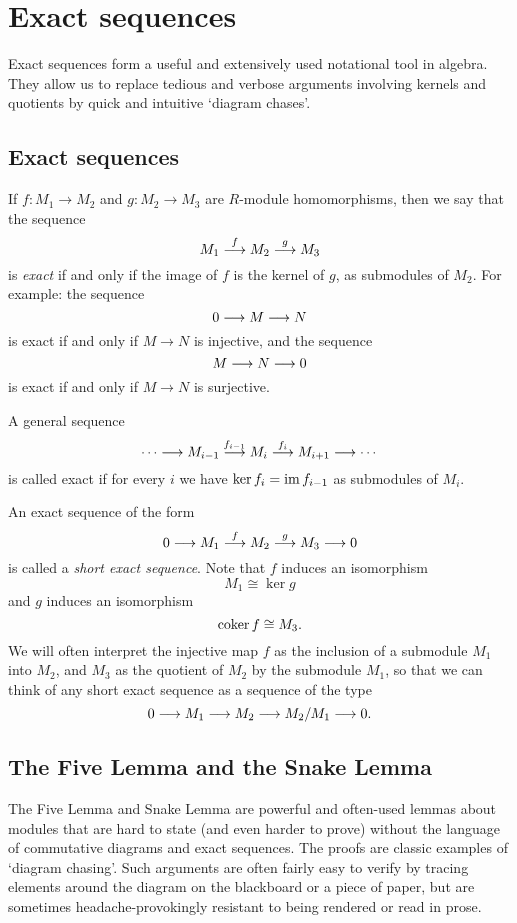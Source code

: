 
\chapter{Exact sequences}

Exact sequences form a useful and extensively used notational tool in algebra.
They allow us to replace tedious and verbose arguments involving kernels and
quotients by quick and intuitive `diagram chases'. 


\section{Exact sequences}


If $f\colon M_1\to M_2$ and $g\colon M_2\to M_3$ are $R$-module homomorphisms, then we say that the sequence
\[
	M_1 \overset{f}{\longrightarrow} M_2 \overset{g}{\longrightarrow} M_3
\]
is \emph{exact} if and only if the image of $f$ is the kernel of $g$, as submodules of $M_2$. For example: the sequence
\[
	0 \longrightarrow M \longrightarrow N
\]
is exact if and only if $M\to N$ is injective, and the sequence
\[
	M \longrightarrow N \longrightarrow 0
\]
is exact if and only if $M\to N$ is surjective. 

A general sequence
\[
	\cdots \longrightarrow M_{i-1} \overset{f_{i-1}}{\longrightarrow} M_i \overset{f_{i}}{\longrightarrow}  M_{i+1} \longrightarrow \cdots
\]
is called exact if for every $i$ we have $\ker f_i = \operatorname{im} f_{i-1}$ as submodules of $M_i$.  


An exact sequence of the form
\[
	0 \longrightarrow M_1 \overset{f}{\longrightarrow} M_2 \overset{g}{\longrightarrow} M_3 \longrightarrow 0
\]
is called a \emph{short exact sequence}. Note that $f$ induces an isomorphism
\[
	M_1 \cong \ker g
\]
and $g$ induces an isomorphism
\[
	\operatorname{coker} f  \cong M_3.
\]
We will often interpret the injective map $f$ as the inclusion of a submodule $M_1$ into $M_2$, and $M_3$ as the quotient of $M_2$ by the submodule $M_1$, so that we can think of any short exact sequence as 
a sequence of the type
\[
	0 \longrightarrow M_1 \longrightarrow M_2 \longrightarrow M_2/M_1 \longrightarrow 0.
\]

\section{The Five Lemma and the Snake Lemma}

The Five Lemma and Snake Lemma are powerful and often-used lemmas about modules that are hard to state (and even harder to prove) without the language of commutative diagrams and exact sequences. The proofs are classic examples of `diagram chasing'. Such arguments are often fairly easy to verify by tracing elements around the diagram on the blackboard or a piece of paper, but are sometimes headache-provokingly resistant to being rendered or read in prose. 


